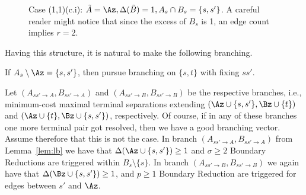 \begin{figure}[H]
	\centering
	\clearpage{}
\figspace
\clearpage{}
	\caption{Case (1,1)(c.i): $\Atr=\Az, \Delta(\Btr)=1, A_s\cap B_s = \{s,s'\}$. A careful reader might notice that since the excess of $B_s$ is 1, an edge count implies $r=2$.}
\label{fig:case-11-ci}
\end{figure}

Having this structure, it is natural to make the following branching.

\begin{branching}
If $A_s\setminus \Az=\{s,s'\}$, then pursue branching on $\{s,t\}$ with fixing $ss'$.
\end{branching}

Let $(A_{ss'\to A},B_{ss'\to A})$ and $(A_{ss'\to B},B_{ss'\to B})$ be the respective branches, i.e., minimum-cost maximal terminal separations extending $(\Az\cup \{s,s'\},\Bz\cup \{t\})$ and $(\Az\cup \{t\},\Bz\cup \{s,s'\})$, respectively. Of course, if in any of these branches one more terminal pair got resolved, then we have a good branching vector. Assume therefore that this is not the case. In branch $(A_{ss'\to A},B_{ss'\to A})$ from Lemma~\ref{lem:lb} we have that $\Delta(\Az\cup \{s,s'\})\geq 1$ and $\sigma\geq 2$ Boundary Reductions are triggered within $B_s\setminus \{s\}$. In branch $(A_{ss'\to B},B_{ss'\to B})$ we again have that $\Delta(\Bz\cup \{s,s'\})\geq 1$, and $p\geq 1$ Boundary Reduction are triggered for edges between $s'$ and $\Az$.


